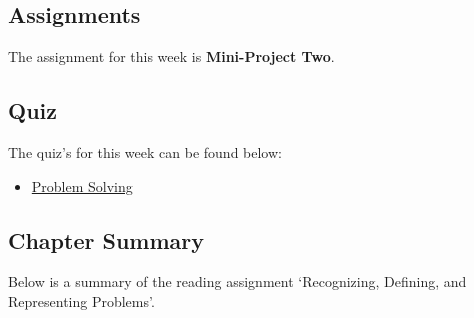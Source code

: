 \subsection{Assignments}

The assignment for this week is \textbf{Mini-Project Two}.  

\subsection{Quiz}

The quiz's for this week can be found below:

\begin{itemize}
    \item \href{https://applied.cs.colorado.edu/mod/quiz/view.php?id=49353}{Problem Solving}  
\end{itemize}

\subsection{Chapter Summary}

Below is a summary of the reading assignment `Recognizing, Defining, and Representing Problems'.

